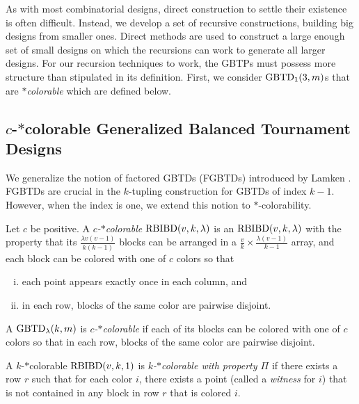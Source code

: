\documentclass[draft, 11pt]{article}
\begin{document}
 As with most combinatorial designs, direct construction to settle their existence
 is often difficult. Instead, we develop a set of recursive constructions, building
 big designs from smaller ones. Direct methods are used to construct a large enough
 set of small designs on which the recursions can work to generate all larger designs.
 For our recursion techniques to work, the GBTPs %
 must possess more structure than stipulated in its definition.
 First, we consider $\textrm{GBTD}_1(3,m)$s that are
 {\em $*$colorable} which are defined below.

 \subsection{$c$-$*$colorable Generalized Balanced Tournament Designs}

We generalize the notion of factored GBTDs (FGBTDs) introduced by Lamken \cite{Lamken:1994}.
FGBTDs are crucial in the $k$-tupling construction for GBTDs of index $k-1$.
However, when the index is one, we extend this notion to $*$-colorability.

 \begin{definition}
 Let $c$ be positive. A {\em $c$-$*$colorable} ${\rm
 RBIBD}(v,k,\lambda)$ is an ${\rm RBIBD}(v,k,\lambda)$ with the property that its
 $\frac{\lambda v(v-1)}{k(k-1)}$ blocks can be arranged in a $\frac{v}{k} \times
 \frac{\lambda (v-1)}{k-1}$ array, and each block can be colored with one of $c$
 colors so that
 \begin{enumerate}[(i)]
 \item each point appears exactly once in each column, and
 \item in each row, blocks of the same color are pairwise disjoint.
 \end{enumerate}
 \end{definition}

\begin{definition}
A $\textrm{GBTD}_\lambda(k,m)$ is {\em $c$-$*$colorable} if each of its
blocks can be colored with one of $c$ colors so that in each row,
blocks of the same color are pairwise disjoint.
\end{definition}

\begin{definition}
 A $k$-$*$colorable ${\rm RBIBD}(v,k,1)$ is {\em $k$-$*$colorable
 with property $\Pi$} if there exists a row $r$ such that for each
 color $i$, there exists a point (called a {\em witness} for $i$)
 that %
 is not contained in any block in row $r$ that is colored $i$.
 \end{definition}
\end{document}
